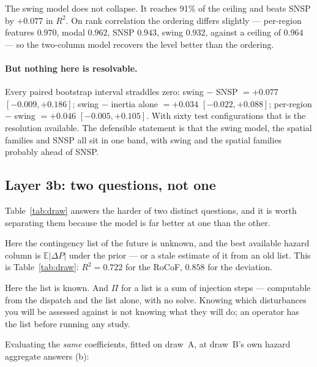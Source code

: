 \documentclass[11pt,a4paper]{article}
\newcommand{\Rtwo}{\ensuremath{R^{2}}}
\begin{document}
The swing model does not collapse. It reaches 91\% of the ceiling and beats
SNSP by $+0.077$ in \Rtwo{}. On rank correlation the ordering differs
slightly --- per-region features $0.970$, modal $0.962$, SNSP $0.943$, swing
$0.932$, against a ceiling of $0.964$ --- so the two-column model recovers the
level better than the ordering.

\paragraph{But nothing here is resolvable.} Every paired bootstrap interval
straddles zero: swing $-$ SNSP $= +0.077$ $[-0.009,+0.186]$; swing $-$ inertia
alone $= +0.034$ $[-0.022,+0.088]$; per-region $-$ swing $= +0.046$
$[-0.005,+0.105]$. With sixty test configurations that is the resolution
available. The defensible statement is that the swing model, the spatial
families and SNSP all sit in one band, with swing and the spatial families
probably ahead of SNSP.

\subsection*{Layer 3b: two questions, not one}
Table~\ref{tab:draw} answers the harder of two distinct questions, and it is
worth separating them because the model is far better at one than the other.

\begin{description}\itemsep2pt
\item[(a) \emph{Under our hazard prior, what is the expected risk?}] Here the
contingency list of the future is unknown, and the best available hazard
column is $\mathbb{E}|\Delta P|$ under the prior --- or a stale estimate of it
from an old list. This is Table~\ref{tab:draw}: $\Rtwo = 0.722$ for the RoCoF,
$0.858$ for the deviation.
\item[(b) \emph{Given \emph{this} contingency list, how risky is this
configuration?}] Here the list is known. And $\Pi$ for a list is a sum of
injection steps --- computable from the dispatch and the list alone, with no
solve. Knowing which disturbances you will be assessed against is not knowing
what they will do; an operator has the list before running any study.
\end{description}

Evaluating the \emph{same} coefficients, fitted on draw~A, at draw~B's own
hazard aggregate answers (b):
\end{document}
